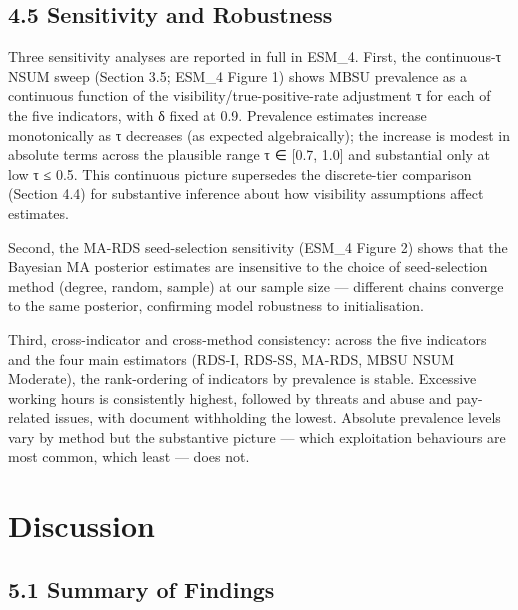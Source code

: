 \documentclass[
  12pt,
  letterpaper,
  DIV=11,
  numbers=noendperiod]{scrartcl}
\begin{document}
\subsection{4.5 Sensitivity and
Robustness}\label{sensitivity-and-robustness}

Three sensitivity analyses are reported in full in ESM\_4. First, the
continuous-τ NSUM sweep (Section 3.5; ESM\_4 Figure 1) shows MBSU
prevalence as a continuous function of the visibility/true-positive-rate
adjustment τ for each of the five indicators, with δ fixed at 0.9.
Prevalence estimates increase monotonically as τ decreases (as expected
algebraically); the increase is modest in absolute terms across the
plausible range τ ∈ {[}0.7, 1.0{]} and substantial only at low τ ≤ 0.5.
This continuous picture supersedes the discrete-tier comparison (Section
4.4) for substantive inference about how visibility assumptions affect
estimates.

Second, the MA-RDS seed-selection sensitivity (ESM\_4 Figure 2) shows
that the Bayesian MA posterior estimates are insensitive to the choice
of seed-selection method (degree, random, sample) at our sample size ---
different chains converge to the same posterior, confirming model
robustness to initialisation.

Third, cross-indicator and cross-method consistency: across the five
indicators and the four main estimators (RDS-I, RDS-SS, MA-RDS, MBSU
NSUM Moderate), the rank-ordering of indicators by prevalence is stable.
Excessive working hours is consistently highest, followed by threats and
abuse and pay-related issues, with document withholding the lowest.
Absolute prevalence levels vary by method but the substantive picture
--- which exploitation behaviours are most common, which least --- does
not.

\section{Discussion}\label{discussion}

\subsection{5.1 Summary of Findings}\label{summary-of-findings}
\end{document}
